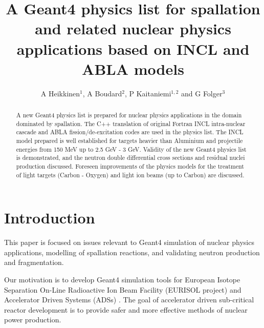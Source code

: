 \documentclass[a4paper]{jpconf}
\begin{document}
\title{A Geant4 physics list for spallation and related nuclear physics applications 
based on INCL and ABLA models}

\author{A Heikkinen$^1$, A Boudard$^2$, P Kaitaniemi$^{1,2}$ and G Folger$^3$}
\address{$^1$ Helsinki Institute of Physics, P.O. Box 64, FIN-00014 University of Helsinki, Finland}
\address{$^2$ CEN-Saclay, CEA-IRFU/SPhN, 91 191 Gif sur Yvette, France}
\address{$^3$ European Organization for Nuclear Research (CERN), Switzerland}


\begin{abstract}
A new Geant4 physics list is prepared for nuclear physics applications
in the domain dominated by spallation.
The C++ translation of original Fortran INCL intra-nuclear 
cascade and ABLA fission/de-excitation codes 
are used in the physics list.
The INCL model prepared is well established for targets heavier than Aluminium
and projectile energies from 150 MeV up to 2.5 GeV - 3 GeV.
Validity of the new Geant4 physics list is demonstrated, 
and the neutron double differential cross sections and residual nuclei production discussed.
Foreseen improvements of the physics models for the treatment of light targets (Carbon - Oxygen)
and light ion beams (up to Carbon) are discussed.
\end{abstract}

\section{Introduction} \label{sec:intro}
This paper is focused on issues relevant to Geant4 \cite{geant4} simulation of nuclear physics applications,
modelling of spallation reactions, and validating neutron production and fragmentation.

Our motivation is to develop Geant4 simulation tools for European Isotope Separation On-Line
Radioactive Ion Beam Facility (EURISOL project) \cite{eurisol} and 
Accelerator Driven Systems (ADSs) \cite{ads}. 
The goal of accelerator driven sub-critical reactor development is to provide safer and more effective
methods of nuclear power production. 
\end{document}
